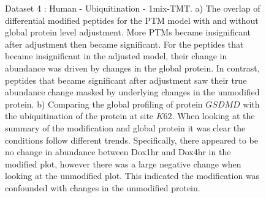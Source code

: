 \documentclass[mcp]{article}
\numberwithin{table}{section}
\begin{document}
\begin{figure}[ht]
\caption{Dataset 4 : Human - Ubiquitination - 1mix-TMT. a) The overlap of differential modified peptides for the PTM model with and without global protein level adjustment. More PTMs became insignificant after adjustment then became significant. For the peptides that became insignificant in the adjusted model, their change in abundance was driven by changes in the global protein. In contrast, peptides that became significant after adjustment saw their true abundance change masked by underlying changes in the unmodified protein. b) Comparing the global profiling of protein $GSDMD$ with the ubiquitination of the protein at site $K62$. When looking at the summary of the modification and global protein it was clear the conditions follow different trends. Specifically, there appeared to be no change in abundance between Dox1hr and Dox4hr in the modified plot, however there was a large negative change when looking at the unmodified plot. This indicated the modification was confounded with changes in the unmodified protein.}
\label{fig:data4_plots}
\end{figure}
\end{document}
